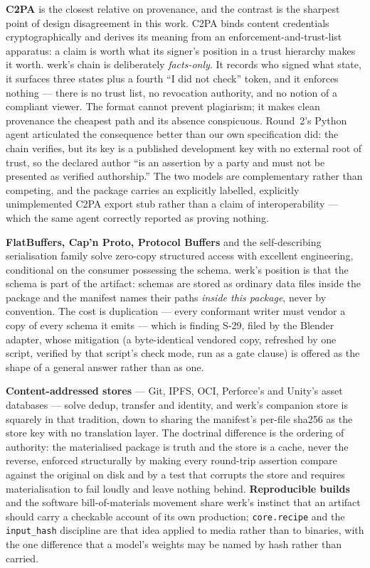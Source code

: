 \documentclass[10pt,twocolumn,letterpaper]{article}
\newcommand{\code}[1]{\texttt{\small #1}}
\begin{document}
\textbf{C2PA} is the closest relative on provenance, and the contrast is the
sharpest point of design disagreement in this work. C2PA binds content credentials
cryptographically and derives its meaning from an enforcement-and-trust-list
apparatus: a claim is worth what its signer's position in a trust hierarchy makes
it worth. werk's chain is deliberately \emph{facts-only}. It records who signed
what state, it surfaces three states plus a fourth ``I did not check'' token, and
it enforces nothing --- there is no trust list, no revocation authority, and no
notion of a compliant viewer. The format cannot prevent plagiarism; it makes clean
provenance the cheapest path and its absence conspicuous. Round~2's Python agent
articulated the consequence better than our own specification did: the chain
verifies, but its key is a published development key with no external root of
trust, so the declared author ``is an assertion by a party and must not be
presented as verified authorship.'' The two models are complementary rather than
competing, and the package carries an explicitly labelled, explicitly unimplemented
C2PA export stub rather than a claim of interoperability --- which the same agent
correctly reported as proving nothing.

\textbf{FlatBuffers, Cap'n Proto, Protocol Buffers} and the self-describing
serialisation family solve zero-copy structured access with excellent engineering,
conditional on the consumer possessing the schema. werk's position is that the
schema is part of the artifact: schemas are stored as ordinary data files inside
the package and the manifest names their paths \emph{inside this package}, never
by convention. The cost is duplication --- every conformant writer must vendor a
copy of every schema it emits --- which is finding S-29, filed by the Blender
adapter, whose mitigation (a byte-identical vendored copy, refreshed by one script,
verified by that script's check mode, run as a gate clause) is offered as the shape
of a general answer rather than as one.

\textbf{Content-addressed stores} --- Git, IPFS, OCI, Perforce's and Unity's asset
databases --- solve dedup, transfer and identity, and werk's companion store is
squarely in that tradition, down to sharing the manifest's per-file sha256 as the
store key with no translation layer. The doctrinal difference is the ordering of
authority: the materialised package is truth and the store is a cache, never the
reverse, enforced structurally by making every round-trip assertion compare against
the original on disk and by a test that corrupts the store and requires
materialisation to fail loudly and leave nothing behind. \textbf{Reproducible
builds} and the software bill-of-materials movement share werk's instinct that an
artifact should carry a checkable account of its own production;
\code{core.recipe} and the \code{input\_hash} discipline are that idea applied to
media rather than to binaries, with the one difference that a model's weights may
be named by hash rather than carried.
\end{document}
